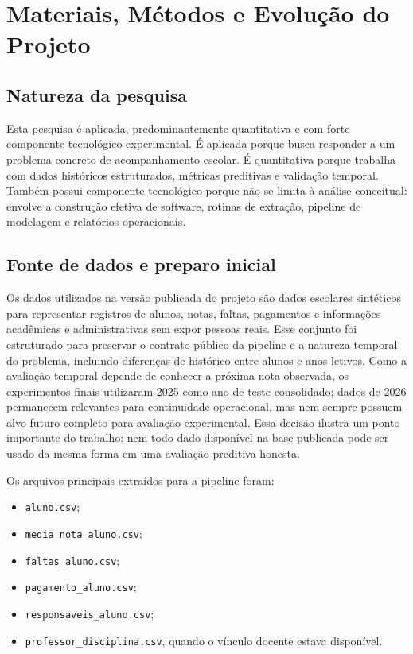 \chapter{Materiais, M\'etodos e Evolu\c{c}\~ao do Projeto}
\label{cap:metodologia}

\section{Natureza da pesquisa}
\label{sec:natureza}

Esta pesquisa \'e aplicada, predominantemente quantitativa e com forte componente tecnol\'ogico-experimental. \'E aplicada porque busca responder a um problema concreto de acompanhamento escolar. \'E quantitativa porque trabalha com dados hist\'oricos estruturados, m\'etricas preditivas e valida\c{c}\~ao temporal. Tamb\'em possui componente tecnol\'ogico porque n\~ao se limita \`a an\'alise conceitual: envolve a constru\c{c}\~ao efetiva de software, rotinas de extra\c{c}\~ao, pipeline de modelagem e relat\'orios operacionais.

\section{Fonte de dados e preparo inicial}
\label{sec:fonte-dados-preparo}

Os dados utilizados na vers\~ao publicada do projeto s\~ao dados escolares sintéticos para representar registros de alunos, notas, faltas, pagamentos e informa\c{c}\~oes acad\^emicas e administrativas sem expor pessoas reais. Esse conjunto foi estruturado para preservar o contrato p\'ublico da pipeline e a natureza temporal do problema, incluindo diferen\c{c}as de hist\'orico entre alunos e anos letivos. Como a avalia\c{c}\~ao temporal depende de conhecer a pr\'oxima nota observada, os experimentos finais utilizaram 2025 como ano de teste consolidado; dados de 2026 permanecem relevantes para continuidade operacional, mas nem sempre possuem alvo futuro completo para avalia\c{c}\~ao experimental. Essa decis\~ao ilustra um ponto importante do trabalho: nem todo dado dispon\'ivel na base publicada pode ser usado da mesma forma em uma avalia\c{c}\~ao preditiva honesta.

Os arquivos principais extra\'idos para a pipeline foram:
\begin{itemize}
    \item \texttt{aluno.csv};
    \item \texttt{media\_nota\_aluno.csv};
    \item \texttt{faltas\_aluno.csv};
    \item \texttt{pagamento\_aluno.csv};
    \item \texttt{responsaveis\_aluno.csv};
    \item \texttt{professor\_disciplina.csv}, quando o v\'inculo docente estava dispon\'ivel.
\end{itemize}

